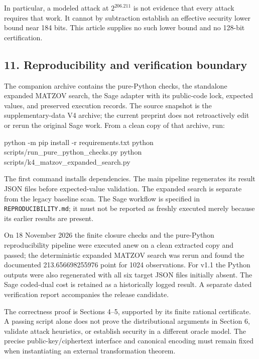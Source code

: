 \documentclass[
  10pt,
  a4paper,
]{article}
\newenvironment{Shaded}{}{}
\newcommand{\AttributeTok}[1]{\textcolor[rgb]{0.49,0.56,0.16}{#1}}
\newcommand{\ExtensionTok}[1]{#1}
\newcommand{\NormalTok}[1]{#1}
\begin{document}
In particular, a modeled attack at \(2^{206.211}\) is not evidence that
every attack requires that work. It cannot by subtraction establish an
effective security lower bound near 184 bits. This article supplies no
such lower bound and no 128-bit certification.

\subsection{11. Reproducibility and verification
boundary}\label{reproducibility-and-verification-boundary}

The companion archive contains the pure-Python checks, the standalone
expanded MATZOV search, the Sage adapter with its public-code lock,
expected values, and preserved execution records. The source snapshot is
the supplementary-data V4 archive; the current preprint does not
retroactively edit or rerun the original Sage work. From a clean copy of
that archive, run:

\begin{Shaded}
\begin{Highlighting}[]
\ExtensionTok{python} \AttributeTok{{-}m}\NormalTok{ pip install }\AttributeTok{{-}r}\NormalTok{ requirements.txt}
\ExtensionTok{python}\NormalTok{ scripts/run\_pure\_python\_checks.py}
\ExtensionTok{python}\NormalTok{ scripts/k4\_matzov\_expanded\_search.py}
\end{Highlighting}
\end{Shaded}

The first command installs dependencies. The main pipeline regenerates
its result JSON files before expected-value validation. The expanded
search is separate from the legacy baseline scan. The Sage workflow is
specified in \texttt{REPRODUCIBILITY.md}; it must not be reported as
freshly executed merely because its earlier results are present.

On 18 November 2026 the finite closure checks and the pure-Python
reproducibility pipeline were executed anew on a clean extracted copy
and passed; the deterministic expanded MATZOV search was rerun and found
the documented 213.656698255976 point for 1024 observations. For v1.1
the Python outputs were also regenerated with all six target JSON files
initially absent. The Sage coded-dual cost is retained as a historically
logged result. A separate dated verification report accompanies the
release candidate.

The correctness proof is Sections 4--5, supported by its finite rational
certificate. A passing script alone does not prove the distributional
arguments in Section 6, validate attack heuristics, or establish
security in a different oracle model. The precise public-key/ciphertext
interface and canonical encoding must remain fixed when instantiating an
external transformation theorem.
\end{document}
